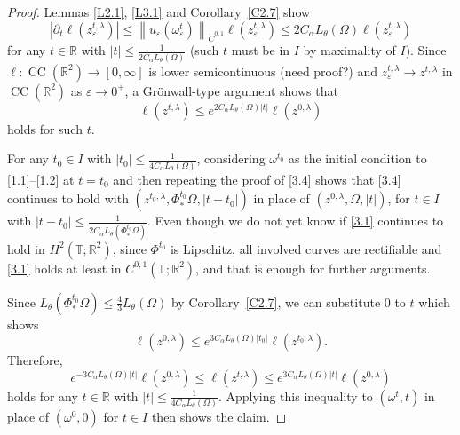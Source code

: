\documentclass[reqno,centertags,12pt]{amsart}
\theoremstyle{definition}
\numberwithin{equation}{section}
\newcommand{\abs}[1]{\left\lvert#1\right\rvert}
\newcommand{\norm}[1]{\left\|#1\right\|}
\newcommand{\bbR}{{\mathbb{R}}}
\newcommand{\bbT}{{\mathbb{T}}}
\newcommand{\eps}{\varepsilon}
\newcommand{\tht}{\theta}
\begin{document}
\begin{proof}
    Lemmas \ref{L2.1}, \ref{L3.1} and Corollary~\ref{C2.7} show
    \begin{equation}\label{3.3}
        \abs{\partial_{t}\ell(z_{\eps}^{t,\lambda})}
        \leq \norm{u_{\eps}(\omega_{\eps}^{t})}_{\dot{C}^{0,1}}
        \ell(z_{\eps}^{t,\lambda})
        \leq 2C_{\alpha}L_{\tht}(\Omega)\ell(z_{\eps}^{t,\lambda})
    \end{equation}
    for any $t\in\bbR$ with $\abs{t}\leq\frac{1}{2C_{\alpha}L_{\tht}(\Omega)}$
    (such $t$ must be in $I$ by maximality of $I$).
    Since $\ell\colon\operatorname{CC}(\bbR^{2})\to[0,\infty]$ is lower semicontinuous
    (need proof?) and $z_{\eps}^{t,\lambda} \to z^{t,\lambda}$
    in $\operatorname{CC}(\bbR^{2})$ as $\eps\to 0^{+}$, a Gr\"{o}nwall-type argument shows that
    \begin{equation}\label{3.4}
        \ell(z^{t,\lambda}) \leq e^{2C_{\alpha}L_{\tht}(\Omega)\abs{t}}\ell(z^{0,\lambda})
    \end{equation}
    holds for such $t$.

    For any $t_{0}\in I$ with $\abs{t_{0}}\leq\frac{1}{4C_{\alpha}L_{\tht}(\Omega)}$,
    considering $\omega^{t_{0}}$ as the initial condition to \eqref{1.1}--\eqref{1.2}
    at $t = t_{0}$ and then repeating the proof of \eqref{3.4} shows that \eqref{3.4}
    continues to hold with $(z^{t_{0},\lambda},\Phi_{*}^{t_{0}}\Omega,\abs{t - t_{0}})$
    in place of $(z^{0,\lambda},\Omega,\abs{t})$,
    for $t\in I$ with $\abs{t - t_{0}}\leq\frac{1}{2C_{\alpha}L_{\tht}(\Phi_{*}^{t_{0}}\Omega)}$.
    Even though we do not yet know if \eqref{3.1} continues to hold in $H^{2}(\bbT;\bbR^{2})$,
    since $\Phi^{t_{0}}$ is Lipschitz, all involved curves are rectifiable and
    \eqref{3.1} holds at least in $C^{0,1}(\bbT;\bbR^{2})$, and that is enough
    for further arguments.

    Since $L_{\tht}(\Phi_{*}^{t_{0}}\Omega) \leq \frac{4}{3}L_{\tht}(\Omega)$ by Corollary~\ref{C2.7},
    we can substitute $0$ to $t$ which shows
    \[
        \ell(z^{0,\lambda}) \leq e^{3C_{\alpha}L_{\tht}(\Omega)\abs{t_{0}}}\ell(z^{t_{0},\lambda}).
    \]
    Therefore,
    \[
        e^{-3C_{\alpha}L_{\tht}(\Omega)\abs{t}}\ell(z^{0,\lambda})
        \leq \ell(z^{t,\lambda}) \leq
        e^{3C_{\alpha}L_{\tht}(\Omega)\abs{t}}\ell(z^{0,\lambda})
    \]
    holds for any $t\in\bbR$ with $\abs{t}\leq\frac{1}{4C_{\alpha}L_{\tht}(\Omega)}$.
    Applying this inequality to $(\omega^{t},t)$ in place of $(\omega^{0},0)$
    for $t\in I$ then shows the claim.
\end{proof}
\end{document}
